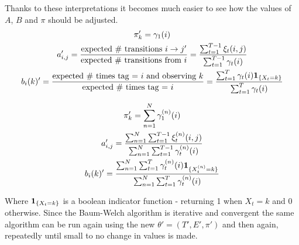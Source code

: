 \documentclass[../main.tex]{subfiles}
\begin{document}
Thanks to these interpretations it becomes much easier to see how the values of $A$, $B$ and $\pi$ should be adjusted.
\begin{gather*}
    \pi_k ' = \gamma_1(i) \\
    a_{i,j}' = \frac{\text{expected \# transitions $i \rightarrow j'$}}{\text{expected \# transitions from $i$}} = \frac{\sum_{t=1}^{T-1} \xi_t(i,j)}{\sum_{t=1}^{T-1} \gamma_t(i)} \\
    b_i(k)' = \frac{\text{expected \# times tag = $i$ and observing $k$}}{\text{expected \# times tag = $i$}} = \frac{\sum_{t=1}^T \gamma_t(i)\mathbf{1}_{\{X_t = k\}}}{\sum_{t=1}^{T} \gamma_t(i)}
\end{gather*}

\begin{gather*}
    \pi_k ' = \sum_{n=1}^N \gamma^{(n)}_1(i) \\
    a_{i,j}' = \frac{\sum_{n=1}^N \sum_{t=1}^{T-1} \xi^{(n)}_t(i,j)}{\sum_{n=1}^N \sum_{t=1}^{T-1} \gamma^{(n)}_t(i)} \\
    b_i(k)' = \frac{\sum_{n=1}^N \sum_{t=1}^T \gamma^{(n)}_t(i)\mathbf{1}_{\{X^{(n)}_t = k\}}}{\sum_{n=1}^N \sum_{t=1}^{T} \gamma^{(n)}_t(i)}
\end{gather*}

Where $\mathbf{1}_{\{X_t = k\}}$ is a boolean indicator function - returning 1 when $X_t=k$ and 0 otherwise.
Since the Baum-Welch algorithm is iterative and convergent the same algorithm can be run again using the new $\theta' = (T', E', \pi')$ and then again, repeatedly until small to no change in values is made.

\end{document}
